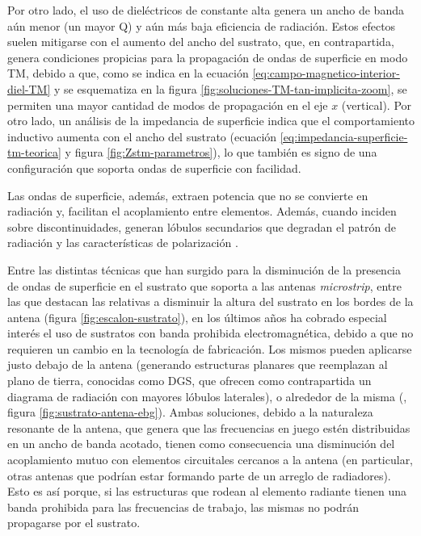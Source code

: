 Por otro lado, el uso de dieléctricos de constante alta genera un ancho de banda aún menor (un mayor Q) y aún más baja eficiencia de radiación. Estos efectos suelen mitigarse con el aumento del ancho del sustrato, que, en contrapartida, genera condiciones propicias para la propagación de ondas de superficie en modo TM, debido a que, como se indica en la ecuación \ref{eq:campo-magnetico-interior-diel-TM} y se esquematiza en la figura \ref{fig:soluciones-TM-tan-implicita-zoom}, se permiten una mayor cantidad de modos de propagación en el eje $x$ (vertical). Por otro lado, un análisis de la impedancia de superficie indica que el comportamiento inductivo aumenta con el ancho del sustrato (ecuación \ref{eq:impedancia-superficie-tm-teorica} y figura \ref{fig:Zstm-parametros}), lo que también es signo de una configuración que soporta ondas de superficie con facilidad.

Las ondas de superficie, además, extraen potencia que no se convierte en radiación y, facilitan el acoplamiento entre elementos. Además, cuando inciden sobre discontinuidades, generan lóbulos secundarios que degradan el patrón de radiación y las características de polarización \cite{Balanis:Theory}.

Entre las distintas técnicas que han surgido para la disminución de la presencia de ondas de superficie en el sustrato que soporta a las antenas \textit{microstrip}, entre las que destacan las relativas a disminuir la altura del sustrato en los bordes de la antena (figura \ref{fig:escalon-sustrato}), en los últimos años ha cobrado especial interés el uso de sustratos con banda prohibida electromagnética, debido a que no requieren un cambio en la tecnología de fabricación. Los mismos pueden aplicarse justo debajo de la antena (generando estructuras planares que reemplazan al plano de tierra, conocidas como DGS, que ofrecen como contrapartida un diagrama de radiación con mayores lóbulos laterales), o alrededor de la misma (\cite{Marcela:Tesis}, figura \ref{fig:sustrato-antena-ebg}). Ambas soluciones, debido a la naturaleza resonante de la antena, que genera que las frecuencias en juego estén distribuidas en un ancho de banda acotado, tienen como consecuencia una disminución del acoplamiento mutuo con elementos circuitales cercanos a la antena (en particular, otras antenas que podrían estar formando parte de un arreglo de radiadores). Esto es así porque, si las estructuras que rodean al elemento radiante tienen una banda prohibida para las frecuencias de trabajo, las mismas no podrán propagarse por el sustrato.


